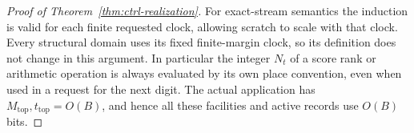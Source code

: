 \begin{proof}[Proof of Theorem~\ref{thm:ctrl-realization}]
For exact-stream semantics the induction is valid for each finite
requested clock, allowing scratch to scale with that clock.  Every
structural domain uses its fixed finite-margin clock, so its definition
does not change in this argument.  In particular the integer $N_t$ of a
score rank or arithmetic operation is always evaluated by its own
place convention, even when used in a request for the next digit.
The actual application has $M_{\mathrm{top}},t_{\mathrm{top}}=O(B)$,
and hence all these facilities and active records use $O(B)$ bits.
\end{proof}

